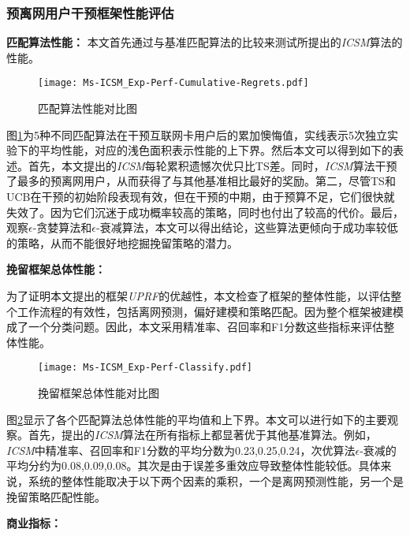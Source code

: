 \subsubsection{预离网用户干预框架性能评估}
\textbf{匹配算法性能：}
本文首先通过与基准匹配算法的比较来测试所提出的\emph{ICSM}算法的性能。\par

\begin{figure}[hbt]
	\centering
	\texttt{[image: Ms-ICSM\_Exp-Perf-Cumulative-Regrets.pdf]}
	\caption{匹配算法性能对比图}
	\label{Fig:Exp-Perf-Cumulative-Regrets}
\end{figure}

图\ref{Fig:Exp-Perf-Cumulative-Regrets}为5种不同匹配算法在干预互联网卡用户后的累加懊悔值，实线表示5次独立实验下的平均性能，对应的浅色面积表示性能的上下界。然后本文可以得到如下的表述。首先，本文提出的\emph{ICSM}每轮累积遗憾次优只比TS差。同时，\emph{ICSM}算法干预了最多的预离网用户，从而获得了与其他基准相比最好的奖励。第二，尽管TS和UCB在干预的初始阶段表现有效，但在干预的中期，由于预算不足，它们很快就失效了。因为它们沉迷于成功概率较高的策略，同时也付出了较高的代价。最后，观察$\epsilon$-贪婪算法和$\epsilon$-衰减算法，本文可以得出结论，这些算法更倾向于成功率较低的策略，从而不能很好地挖掘挽留策略的潜力。


\textbf{挽留框架总体性能：}\par
为了证明本文提出的框架\emph{UPRF}的优越性，本文检查了框架的整体性能，以评估整个工作流程的有效性，包括离网预测，偏好建模和策略匹配。因为整个框架被建模成了一个分类问题。因此，本文采用精准率、召回率和F1分数这些指标来评估整体性能。\par
\begin{figure}[hbt]
	\centering
	\texttt{[image: Ms-ICSM\_Exp-Perf-Classify.pdf]}
	\caption{挽留框架总体性能对比图}
	\label{Fig:Exp-Perf-Classify}
\end{figure}

图\ref{Fig:Exp-Perf-Classify}显示了各个匹配算法总体性能的平均值和上下界。本文可以进行如下的主要观察。首先，提出的\emph{ICSM}算法在所有指标上都显著优于其他基准算法。例如，\emph{ICSM}中精准率、召回率和F1分数的平均分数为{0.23,0.25,0.24}，次优算法$\epsilon$-衰减的平均分约为{0.08,0.09,0.08}。其次是由于误差多重效应导致整体性能较低。具体来说，系统的整体性能取决于以下两个因素的乘积，一个是离网预测性能，另一个是挽留策略匹配性能。

\textbf{商业指标：}


